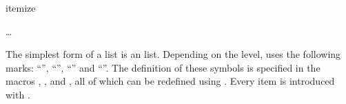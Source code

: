   \begin{Declaration}
    \begin{Environment}{itemize}
      \begin{Body}
         \dots
        \BodyDots
      \end{Body}
    \end{Environment}
  \end{Declaration}%
  The simplest form of a list is an  list.
  \iffalse %
    The users of a certain disliked word processing package often refer to
    this form of a list as \emph{bulletpoints}.  Presumably, these users
    are unable to envisage that, depending on the level, a different
    symbol from a large dot could be used to introduce each
    point. %
  \fi%
  Depending on the level, {\KOMAScript} uses the following marks:
  ``{}'', ``{}'', ``{}'' and
  ``{}''. The definition of these symbols is specified in
  the macros , ,
   and , all of which can be
  redefined using . Every item is introduced with
  .%
